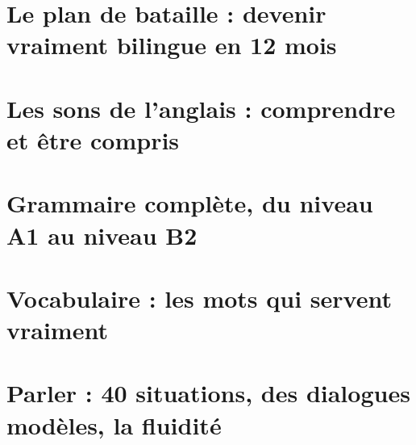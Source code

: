 \documentclass[11pt,a4paper,oneside]{book}
\begin{document}
\frontmatter


\tableofcontents
\pagevierge

\mainmatter

\part{Le plan de bataille : devenir vraiment bilingue en 12 mois}



\part{Les sons de l'anglais : comprendre et être compris}


\part{Grammaire complète, du niveau A1 au niveau B2}





\part{Vocabulaire : les mots qui servent vraiment}



\part{Parler : 40 situations, des dialogues modèles, la fluidité}


\end{document}
